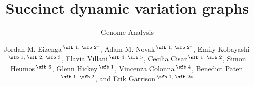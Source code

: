 \documentclass{bioinfo}
\begin{document}

\subtitle{Genome Analysis}

\title[short Title]{Succinct dynamic variation graphs}
\author[Eizenga, \textit{et~al}.]{
Jordan M. Eizenga\,$^{\text{\sfb 1, \sfb 2} \dagger}$, 
Adam M. Novak\,$^{\text{\sfb 1, \sfb 2} \dagger}$, 
Emily Kobayashi\,$^{\text{\sfb 1, \sfb 2, \sfb 3}}$,
Flavia Villani\,$^{\text{\sfb 4, \sfb 5}}$,
Cecilia Cisar\,$^{\text{\sfb 1, \sfb 2}}$,
Simon Heumos\,$^{\text{\sfb 6}}$,
Glenn Hickey\,$^{\text{\sfb 1}}$,
Vincenza Colonna\,$^{\text{\sfb 4}}$,
Benedict Paten\,$^{\text{\sfb 1, \sfb 2}}$,
and Erik Garrison\,$^{\text{\sfb 1, \sfb 2}*}$
}

\address{
$^{\text{\sf 1}}$Genomics Institute, University of California Santa Cruz, Santa Cruz, CA, USA, 95064, and \\
$^{\text{\sf 2}}$Biomolecular Engineering and Bioinformatics, University of California Santa Cruz, Santa Cruz, CA, USA, 95064, \\
$^{\text{\sf 3}}$Bioinformatics and Systems Biology, University of California San Diego, La Jolla, CA, USA, 92093, \\
$^{\text{\sf 4}}$Institute of Genetics and Biophysics, Consiglio Nazionale di Ricerche, Naples, Italy, 80131, \\
$^{\text{\sf 5}}$Biotecnologie Mediche, Universit\`a degli Studi di Napoli Federico II, Naples, Italy, 80138, and \\
$^{\text{\sf 6}}$Quantitative Biology Center (QBiC), University of T\"ubingen, T\"ubingen, Germany, 72076
}



\end{document}
